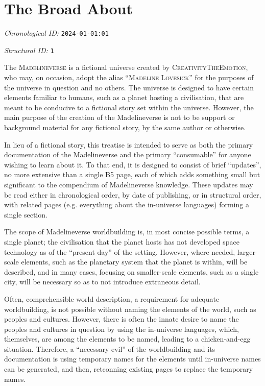 \section{The Broad About}
\emph{Chronological ID:} \texttt{2024-01-01:01}

\emph{Structural ID:} \texttt{1}

The \textsc{Madelineverse} is a fictional universe created by \textsc{CreativityTheEmotion}, who may, on occasion, adopt the alias ``\textsc{Madeline Lovesick}'' for the purposes of the universe in question and no others. The universe is designed to have certain elements familiar to humans, such as a planet hosting a civilisation, that are meant to be conducive to a fictional story set within the universe. However, the main purpose of the creation of the Madelineverse is not to be support or background material for any fictional story, by the same author or otherwise.

In lieu of a fictional story, this treatise is intended to serve as both the primary documentation of the Madelineverse and the primary ``consumable'' for anyone wishing to learn about it. To that end, it is designed to consist of brief ``updates'', no more extensive than a single B5 page, each of which adds something small but significant to the compendium of Madelineverse knowledge. These updates may be read either in chronological order, by date of publishing, or in structural order, with related pages (e.g. everything about the in-universe languages) forming a single section.

The scope of Madelineverse worldbuilding is, in most concise possible terms, a single planet; the civilisation that the planet hosts has not developed space technology as of the ``present day'' of the setting. However, where needed, larger-scale elements, such as the planetary system that the planet is within, will be described, and in many cases, focusing on smaller-scale elements, such as a single city, will be necessary so as to not introduce extraneous detail.

Often, comprehensible world description, a requirement for adequate worldbuilding, is not possible without naming the elements of the world, such as peoples and cultures. However, there is often the innate desire to name the peoples and cultures in question by using the in-universe languages, which, themselves, are among the elements to be named, leading to a chicken-and-egg situation. Therefore, a ``necessary evil'' of the worldbuilding and its documentation is using temporary names for the elements until in-universe names can be generated, and then, retconning existing pages to replace the temporary names.
\newpage
